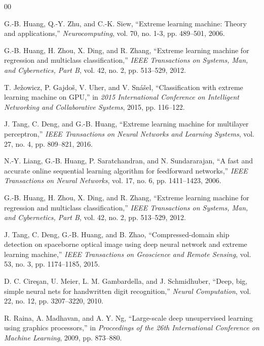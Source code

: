 \documentclass[conference]{IEEEtran}
\begin{document}
\begin{thebibliography}{00}

G.-B. Huang, Q.-Y. Zhu, and C.-K. Siew, ``Extreme learning machine: Theory and applications,'' \textit{Neurocomputing}, vol. 70, no. 1-3, pp. 489--501, 2006.

G.-B. Huang, H. Zhou, X. Ding, and R. Zhang, ``Extreme learning machine for regression and multiclass classification,'' \textit{IEEE Transactions on Systems, Man, and Cybernetics, Part B}, vol. 42, no. 2, pp. 513--529, 2012.

T. Ježowicz, P. Gajdoš, V. Uher, and V. Snášel, ``Classification with extreme learning machine on GPU,'' in \textit{2015 International Conference on Intelligent Networking and Collaborative Systems}, 2015, pp. 116--122.

J. Tang, C. Deng, and G.-B. Huang, ``Extreme learning machine for multilayer perceptron,'' \textit{IEEE Transactions on Neural Networks and Learning Systems}, vol. 27, no. 4, pp. 809--821, 2016.

N.-Y. Liang, G.-B. Huang, P. Saratchandran, and N. Sundararajan, ``A fast and accurate online sequential learning algorithm for feedforward networks,'' \textit{IEEE Transactions on Neural Networks}, vol. 17, no. 6, pp. 1411--1423, 2006.

G.-B. Huang, H. Zhou, X. Ding, and R. Zhang, ``Extreme learning machine for regression and multiclass classification,'' \textit{IEEE Transactions on Systems, Man, and Cybernetics, Part B}, vol. 42, no. 2, pp. 513--529, 2012.

J. Tang, C. Deng, G.-B. Huang, and B. Zhao, ``Compressed-domain ship detection on spaceborne optical image using deep neural network and extreme learning machine,'' \textit{IEEE Transactions on Geoscience and Remote Sensing}, vol. 53, no. 3, pp. 1174--1185, 2015.

D. C. Cireşan, U. Meier, L. M. Gambardella, and J. Schmidhuber, ``Deep, big, simple neural nets for handwritten digit recognition,'' \textit{Neural Computation}, vol. 22, no. 12, pp. 3207--3220, 2010.

R. Raina, A. Madhavan, and A. Y. Ng, ``Large-scale deep unsupervised learning using graphics processors,'' in \textit{Proceedings of the 26th International Conference on Machine Learning}, 2009, pp. 873--880.


\end{thebibliography}
\end{document}
